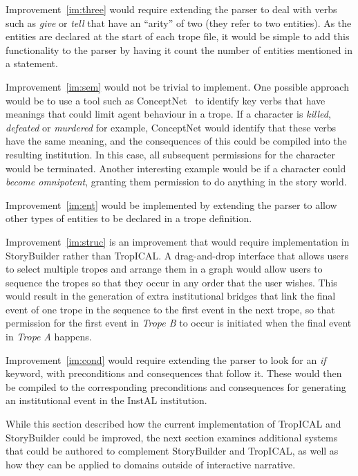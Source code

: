 \documentclass[11pt]{report}
\begin{document}
Improvement~\ref{im:three} would require extending the parser to deal with
verbs such as \emph{give} or \emph{tell} that have an ``arity'' of two (they
refer to two entities). As the entities are declared at the start of each trope file, it
would be simple to add this functionality to the parser by having it count the
number of entities mentioned in a statement.

Improvement~\ref{im:sem} would not be trivial to implement. One possible
approach would be to use a tool such as ConceptNet~\citep{liu2004conceptnet} to
identify key verbs that have meanings that could limit agent behaviour in a
trope. If a character is \emph{killed}, \emph{defeated} or \emph{murdered} for
example, ConceptNet would identify that these verbs have the same meaning, and
the consequences of this could be compiled into the resulting institution. In
this case, all subsequent permissions for the character would be terminated.
Another interesting example would be if a character could \emph{become
  omnipotent}, granting them permission to do anything in the story world.

Improvement~\ref{im:ent} would be implemented by extending the parser to allow
other types of entities to be declared in a trope definition.

Improvement~\ref{im:struc} is an improvement that would require implementation
in StoryBuilder rather than TropICAL. A drag-and-drop interface that allows
users to select multiple tropes and arrange them in a graph would allow users to
sequence the tropes so that they occur in any order that the user wishes. This would
result in the generation of extra institutional bridges that link the final
event of one trope in the sequence to the first event in the next trope, so that
permission for the first event in \emph{Trope B} to occur is initiated when the
final event in \emph{Trope A} happens.

Improvement~\ref{im:cond} would require extending the parser to look for an
\emph{if} keyword, with preconditions and consequences that follow it. These
would then be compiled to the corresponding preconditions and consequences for
generating an institutional event in the InstAL institution.

While this section described how the current implementation of TropICAL and
StoryBuilder could be improved, the next section examines additional systems that could be
authored to complement StoryBuilder and TropICAL, as well as how they can be
applied to domains outside of interactive narrative.
\end{document}
